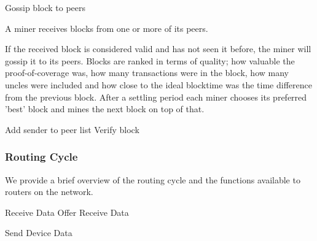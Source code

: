 \documentclass[10pt, nonatbib, nocopyrightspace, reprint]{sigplanconf}
\begin{document}
\begin{description}
    \begin{algorithm}[!htb]
      \DontPrintSemicolon
      \caption{Miner Block Submit}\label{proto:miner.block.submit}

       {
        Gossip block to peers\;
      }
    \end{algorithm}
    \FloatBarrier

  \item [Receive Block] A miner receives blocks from one or more of its peers.

    If the received block is considered valid and has not seen it before, the miner will gossip it to its peers. Blocks are ranked in terms of quality; how valuable the proof-of-coverage was, how many transactions were in the block, how many uncles were included and how close to the ideal blocktime was the time difference from the previous block. After a settling period each miner chooses its preferred 'best' block and mines the next block on top of that.

    \begin{algorithm}[!htb]
      \DontPrintSemicolon
      \caption{Miner Block Receive}\label{proto:miner.block.recv}

       {
        Add sender to peer list\;
        Verify block\;
      }
    \end{algorithm}
    \FloatBarrier

\end{description}


\subsubsection{Routing Cycle}

We provide a brief overview of the routing cycle and the functions available to routers on the network.

\begin{algorithm}[!htb]
  \DontPrintSemicolon
  \caption{Router Cycle Overview}\label{cycle:router}

   {
    Receive Data Offer \;
    Receive Data \;
  }

   {
    Send Device Data \;
  }
\end{algorithm}
\FloatBarrier
\end{document}
